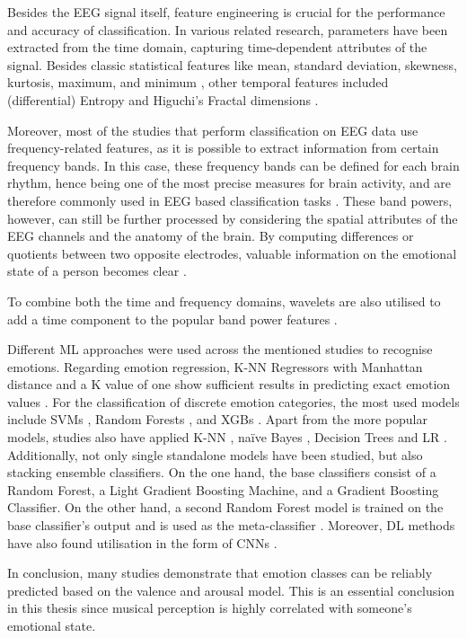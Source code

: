     Besides the \ac{EEG} signal itself, feature engineering is crucial for the performance and accuracy of classification. In various related research, parameters have been extracted from the time domain, capturing time-dependent attributes of the signal. Besides classic statistical features like mean, standard deviation, skewness, kurtosis, maximum, and minimum \cite{chatterjee2022eeg,wang2014emotional}, other temporal features included (differential) Entropy and Higuchi's Fractal dimensions \cite{alhalaseh2020machine,hasan2025comparative}. \par
    Moreover, most of the studies that perform classification on \ac{EEG} data use frequency-related features, as it is possible to extract information from certain frequency bands. In this case, these frequency bands can be defined for each brain rhythm, hence being one of the most precise measures for brain activity, and are therefore commonly used in \ac{EEG} based classification tasks \cite{abdumalikov2024performance,galvao2021predicting,li2018exploring,lin2010eeg}. These band powers, however, can still be further processed by considering the spatial attributes of the \ac{EEG} channels and the anatomy of the brain. By computing differences or quotients between two opposite electrodes, valuable information on the emotional state of a person becomes clear \cite{galvao2021predicting,lin2010eeg}. \par
    To combine both the time and frequency domains, wavelets are also utilised to add a time component to the popular band power features \cite{galvao2021predicting,wang2014emotional}. \par
    
    Different \ac{ML} approaches were used across the mentioned studies to recognise emotions. Regarding emotion regression, \ac{K-NN} Regressors with Manhattan distance and a K value of one show sufficient results in predicting exact emotion values \cite{galvao2021predicting}. For the classification of discrete emotion categories, the most used models include \ac{SVM}s \cite{abdumalikov2024performance,hasan2025comparative,li2018exploring,lin2010eeg,wang2014emotional}, Random Forests \cite{abdumalikov2024performance,chatterjee2022eeg}, and \ac{XGB}s \cite{abdumalikov2024performance,chatterjee2022eeg,hasan2025comparative}. Apart from the more popular models, studies also have applied \ac{K-NN} \cite{alhalaseh2020machine,hasan2025comparative}, na\"ive Bayes \cite{alhalaseh2020machine}, Decision Trees \cite{alhalaseh2020machine} and \ac{LR} \cite{abdumalikov2024performance}. Additionally, not only single standalone models have been studied, but also stacking ensemble classifiers. On the one hand, the base classifiers consist of a Random Forest, a Light Gradient Boosting Machine, and a Gradient Boosting Classifier. On the other hand, a second Random Forest model is trained on the base classifier's output and is used as the meta-classifier \cite{chatterjee2022eeg}. Moreover, \ac{DL} methods have also found utilisation in the form of \ac{CNN}s \cite{alhalaseh2020machine}.\par
    
    In conclusion, many studies demonstrate that emotion classes can be reliably predicted based on the valence and arousal model. This is an essential conclusion in this thesis since musical perception is highly correlated with someone's emotional state.